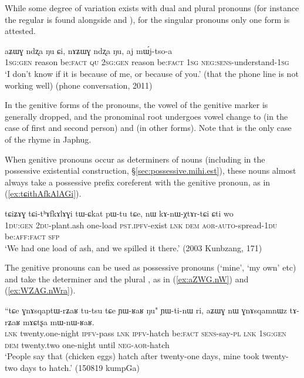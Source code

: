 While some degree of variation exists with dual and plural pronouns (for instance the regular  is found alongside  and ), for the singular pronouns only one form is attested.

\begin{exe}
\ex
\gll aʑɯɣ 	ndʐa 	ŋu 	ɕi, 	nɤʑɯɣ 	ndʐa 	ŋu, 	aj 	mɯ́j-tso-a   \\
\textsc{1sg}:\textsc{gen} reason be:\textsc{fact} \textsc{qu} \textsc{2sg}:\textsc{gen} reason be:\textsc{fact} \textsc{1sg} \textsc{neg}:\textsc{sens}-understand-\textsc{1sg} \\
\glt  `I don't know if it is because of me, or because of you.' (that the phone line is not working well) (phone conversation, 2011) %
\end{exe} 

In the genitive forms of the pronouns, the vowel of the genitive marker is generally dropped, and the pronominal root  undergoes vowel change to  (in the case of first and second person) and  (in other forms). Note that  is the only case of the rhyme  in Japhug.

When genitive pronouns occur as determiners of nouns (including in the possessive existential construction, §\ref{sec:possessive.mihi.est}), these nouns almost always take a possessive prefix coreferent with the genitive pronoun, as in (\ref{ex:tɕithAfkAlAGi}).

\begin{exe}
\ex \label{ex:tɕithAfkAlAGi}
\gll 
tɕiʑɤɣ tɕi-tʰɤfkɤlɤɣi tɯ-ɕkat pɯ-tu tɕe, nɯ kɤ-nɯ-χtɤr-tɕi ɕti wo \\
\textsc{1du}:\textsc{gen} \textsc{2du}-plant.ash one-load \textsc{pst}.\textsc{ipfv}-exist \textsc{lnk} \textsc{dem} \textsc{aor}-\textsc{auto}-spread-\textsc{1du} be:\textsc{aff}:\textsc{fact} \textsc{sfp} \\
\glt `We had one load of ash, and we spilled it there.' (2003 Kunbzang, 171)
\end{exe} 

The genitive pronouns can be used as possessive pronouns (`mine', `my own' etc) and take the determiner  and the plural , as in (\ref{ex:aZWG.nW}) and (\ref{ex:WZAG.nWra}).

\begin{exe}
\ex \label{ex:aZWG.nW}
\gll ``tɕe ɣnɤsqaptɯ-rʑaʁ tu-tsu tɕe ɲɯ-ʁaʁ ŋu" ɲɯ-ti-nɯ ri, aʑɯɣ nɯ ɣnɤsqamnɯz tɤ-rʑaʁ mɤɕtʂa mɯ-nɯ-ʁaʁ. \\
\textsc{lnk} twenty.one-night \textsc{ipfv}-pass \textsc{lnk} \textsc{ipfv}-hatch be:\textsc{fact} \textsc{sens}-say-\textsc{pl} \textsc{lnk} \textsc{1sg}:\textsc{gen} \textsc{dem} twenty.two one-night  until \textsc{neg}-\textsc{aor}-hatch \\
\glt `People say that (chicken eggs) hatch after twenty-one days, mine took twenty-two days to hatch.' (150819 kumpGa)
\end{exe} 

